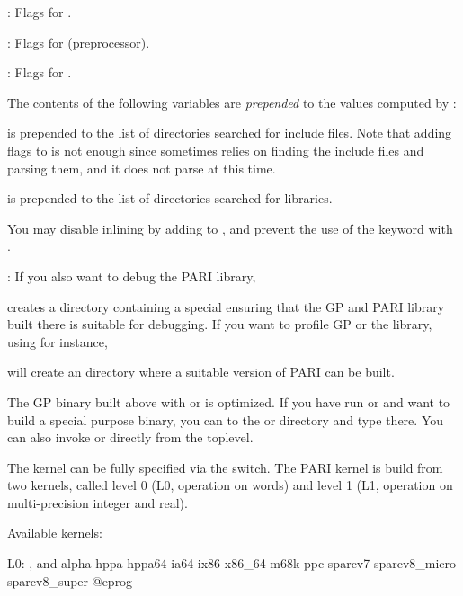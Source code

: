 : Flags for .

: Flags for  (preprocessor).

: Flags for .

\noindent The contents of the following variables are \emph{prepended} to
the values computed by :

 is prepended to the list of directories
searched for include files. Note that adding  flags to
 is not enough since  sometimes
relies on finding the include files and parsing them, and it does not 
parse  at this time.

 is prepended to the list of directories
searched for libraries.

\noindent You may disable inlining by adding  to
, and prevent the use of the  keyword with
.

: If you also want to debug the PARI library,


\noindent creates a directory  containing a special
 ensuring that the GP and PARI library built there is
suitable for debugging. If you want to
profile GP or the library, using  for instance,


\noindent will create an  directory where a suitable version
of PARI can be built.

The GP binary built above with  or  is optimized.
If you have run  or  and want to build a special
purpose binary, you can  to the  or  directory
and type  there. You can also invoke  or
 directly from the toplevel.

 The kernel can be fully specified via the
 switch. The PARI kernel is build from two kernels,
called level 0 (L0, operation on words) and level 1 (L1, operation on
multi-precision integer and real).

\noindent Available kernels:

L0: ,  and
\bprog
  alpha hppa hppa64 ia64 ix86 x86_64 m68k ppc sparcv7
  sparcv8_micro sparcv8_super
@eprog

